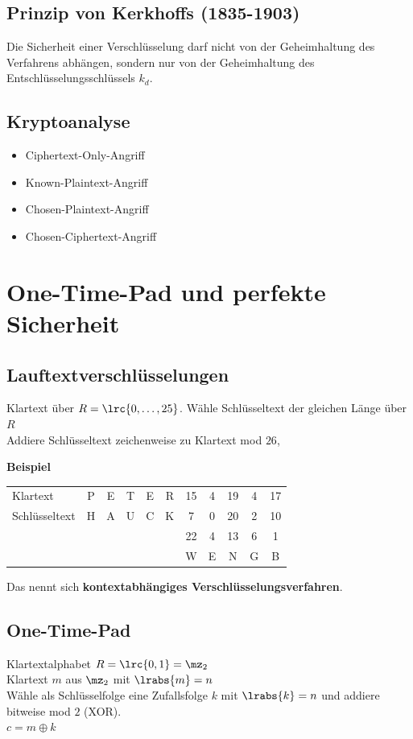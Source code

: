 	\subsection{Prinzip von Kerkhoffs (1835-1903)}
		Die Sicherheit einer Verschlüsselung darf nicht von der Geheimhaltung des Verfahrens abhängen, sondern nur von der Geheimhaltung des Entschlüsselungsschlüssels $k_d$.
		
	\subsection{Kryptoanalyse}
		\begin{itemize}
			\item Ciphertext-Only-Angriff
			\item Known-Plaintext-Angriff
			\item Chosen-Plaintext-Angriff
			\item Chosen-Ciphertext-Angriff
	\end{itemize}
	
\section{One-Time-Pad und perfekte Sicherheit}
	\subsection{Lauftextverschlüsselungen}
		Klartext über $R=\lrc{0,\dots,25}$. Wähle Schlüsseltext der gleichen Länge über $R$\\
		Addiere Schlüsseltext zeichenweise zu Klartext mod $26$,
		
		\textbf{Beispiel}
		
		\begin{tabular}{lcccccccccc}
			Klartext&P&E&T&E&R&15&4&19&4&17\\
			Schlüsseltext&H&A&U&C&K&7&0&20&2&10\\\cline{7-11}
			&&&&&&22&4&13&6&1\\
			&&&&&&W&E&N&G&B
		\end{tabular}
		
		Das nennt sich \textbf{kontextabhängiges Verschlüsselungsverfahren}.
		
	\subsection{One-Time-Pad}
		Klartextalphabet $R=\lrc{0,1}=\mz_2$\\
		Klartext $m$ aus $\mz_2$ mit $\lrabs{m}=n$\\
		Wähle als Schlüsselfolge eine Zufallsfolge $k$ mit $\lrabs{k}=n$ und addiere bitweise mod $2$ (XOR).\\
		$c=m\oplus k$
		
